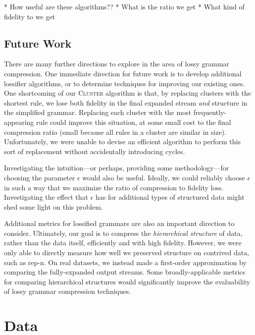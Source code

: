 \documentclass[11pt]{article}
\newcommand{\Cluster}{\textsc{Cluster}\xspace}
\begin{document}
* How useful are these algorithms??
* What is the ratio we get
* What kind of fidelity to we get

\subsection{Future Work}

There are many further directions to explore in the area of lossy grammar
compression.  One immediate direction for future work is to develop additional
lossifier algorithms, or to determine techniques for improving our existing
ones.  One shortcoming of our \Cluster algorithm is that, by replacing clusters
with the shortest rule, we lose both fidelity in the final expanded stream
\emph{and} structure in the simplified grammar.  Replacing each cluster with
the most frequently-appearing rule could improve this situation, at some small
cost to the final compression ratio (small because all rules in a cluster are
similar in size).  Unfortunately, we were unable to devise an efficient
algorithm to perform this sort of replacement without accidentally introducing
cycles.

Investigating the intuition---or perhaps, providing some methodology---for
choosing the parameter $\epsilon$ would also be useful.  Ideally, we could
reliably choose $\epsilon$ in such a way that we maximize the ratio of
compression to fidelity loss.  Investigating the effect that $\epsilon$ has for
additional types of structured data might shed some light on this problem.

Additional metrics for lossified grammars are also an important direction to
consider.  Ultimately, our goal is to compress the \emph{hierarchical
structure} of data, rather than the data itself, efficiently and with high
fidelity.  However, we were only able to directly measure how well we preserved
structure on contrived data, such as rep-n.  On real datasets, we instead made
a first-order approximation by comparing the fully-expanded output streams.
Some broadly-applicable metrics for comparing hierarchical structures would
significantly improve the evaluability of lossy grammar compression techniques.

\pagebreak

\nocite{*}



\pagebreak

\appendix

\section{Data}
\end{document}
